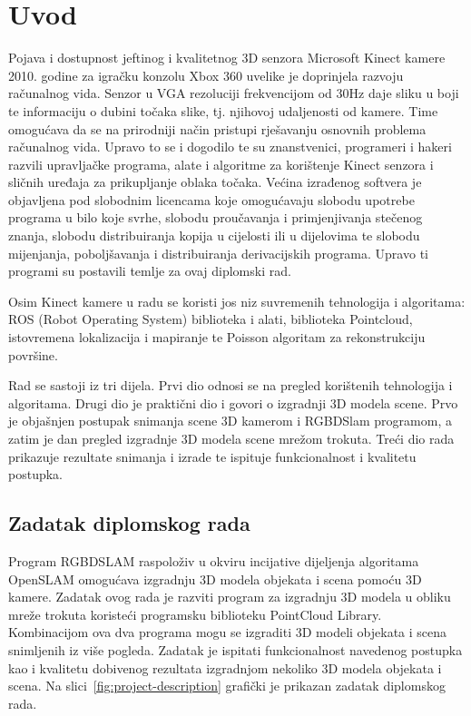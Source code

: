 \newpage

\setcounter{page}{1}
\setcounter{figure}{0}
\section{Uvod}%
\label{sec:Uvod}

Pojava i dostupnost jeftinog i kvalitetnog 3D senzora Microsoft Kinect
kamere 2010. godine za igračku konzolu Xbox 360 uvelike je doprinjela
razvoju računalnog vida. Senzor u VGA rezoluciji frekvencijom od 30Hz
daje sliku u boji te informaciju o dubini točaka slike, tj. njihovoj
udaljenosti od kamere. Time omogućava da se na prirodniji način pristupi
rješavanju osnovnih problema računalnog vida.  Upravo to se i dogodilo
te su znanstvenici, programeri i hakeri razvili upravljačke programa,
alate i algoritme za korištenje Kinect senzora i sličnih uređaja za
prikupljanje oblaka točaka. Većina izrađenog softvera je objavljena pod
slobodnim licencama koje omogućavaju slobodu upotrebe programa u bilo
koje svrhe, slobodu proučavanja i primjenjivanja stečenog znanja,
slobodu distribuiranja kopija u cijelosti ili u dijelovima te slobodu
mijenjanja, poboljšavanja i distribuiranja derivacijskih programa.
Upravo ti programi su postavili temlje za ovaj diplomski rad.

Osim Kinect kamere u radu se koristi jos niz suvremenih tehnologija i
algoritama: ROS (Robot Operating System) biblioteka i alati, biblioteka
Pointcloud, istovremena lokalizacija i mapiranje te Poisson algoritam za
rekonstrukciju površine.

Rad se sastoji iz tri dijela. Prvi dio odnosi se na pregled korištenih
tehnologija i algoritama. Drugi dio je praktični dio i govori o
izgradnji 3D modela scene. Prvo je objašnjen postupak snimanja scene 3D
kamerom i RGBDSlam programom, a zatim je dan pregled izgradnje 3D modela
scene mrežom trokuta. Treći dio rada prikazuje rezultate snimanja i
izrade te ispituje funkcionalnost i kvalitetu postupka.

\newpage
\subsection{Zadatak diplomskog rada} %
\label{sub:Zadatak diplomskog rada}

Program RGBDSLAM raspoloživ u okviru incijative dijeljenja algoritama
OpenSLAM omogućava izgradnju 3D modela objekata i scena pomoću 3D
kamere. Zadatak ovog rada je razviti program za izgradnju 3D modela u
obliku mreže trokuta koristeći programsku biblioteku PointCloud Library.
Kombinacijom ova dva programa mogu se izgraditi 3D modeli objekata i
scena snimljenih iz više pogleda. Zadatak je ispitati funkcionalnost
navedenog postupka kao i kvalitetu dobivenog rezultata izgradnjom
nekoliko 3D modela objekata i scena. Na
slici~\ref{fig:project-description} grafički je prikazan zadatak
diplomskog rada.

